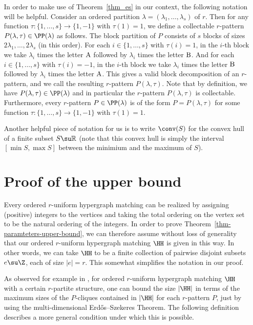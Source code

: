 In order to make use of Theorem~\ref{thm_es} in our context, the following notation will be helpful. Consider an ordered partition $\lambda=(\lambda_1,\dots,\lambda_s)$ of $r$. Then for any function $\tau:\{1,\dots,s\}\to \{1,-1\}$ with $\tau(1)=1$, we define a collectable $r$-pattern $P(\lambda,\tau)\in \PP(\lambda)$ as follows. The block partition of $P$ consists of $s$ blocks of sizes $2\lambda_1,\dots,2\lambda_s$ (in this order). For each $i\in\{1,\dots,s\}$ with $\tau(i)=1$, in the $i$-th block we take $\lambda_i$ times the letter $\rm A$ followed by $\lambda_i$ times the letter $\rm B$. And for each $i\in\{1,\dots,s\}$ with $\tau(i)=-1$, in the $i$-th block we take $\lambda_i$ times the letter $\rm B$ followed by $\lambda_i$ times the letter $\rm A$. This gives a valid block decomposition of an $r$-pattern, and we call the resulting $r$-pattern $P(\lambda,\tau)$. Note that by definition, we have $P(\lambda,\tau)\in \PP(\lambda)$ and in particular the $r$-pattern $P(\lambda,\tau)$ is collectable. Furthermore, every $r$-pattern $P\in \PP(\lambda)$ is of the form $P=P(\lambda,\tau)$ for some function $\tau:\{1,\dots,s\}\to \{1,-1\}$ with $\tau(1)=1$.

Another helpful piece of notation for us is to write $\conv(S)$ for the convex hull of a finite subset $S\su \mathbb{R}$ (note that this convex hull is simply the interval $[\min S,\max S]$ between the minimium and the maximum of $S$).


\section{Proof of the upper bound}
\label{sect-upper-bound}

Every ordered $r$-uniform hypergraph matching can be realized by assigning (positive) integers to the vertices and taking the total ordering on the vertex set to be the natural ordering of the integers. In order to prove Theorem~\ref{thm-paramteters-upper-bound}, we can therefore assume without loss of generality that our ordered $r$-uniform hypergraph matching $\HH$ is given in this way. In other words, we can take $\HH$ to be a finite collection of pairwise disjoint subsets $e\su \Z$, each of size $|e|=r$. This somewhat simplifies the notation in our proof.

As observed for example in \cite{AJKS}, for ordered $r$-uniform hypergraph matching $\HH$ with a certain $r$-partite structure, one can bound the size $|\HH|$ in terms of the maximum sizes of the $P$-cliques contained in $|\HH|$ for each $r$-pattern $P$, just by using the multi-dimensional Erd\H{o}s--Szekeres Theorem. The following definition describes a more general condition under which this is possible.

